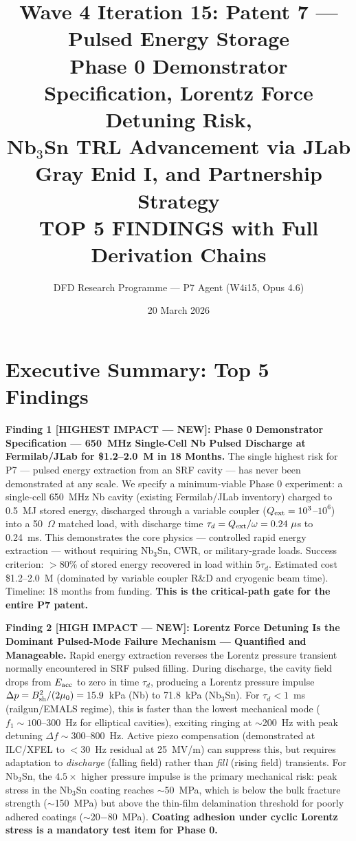 \documentclass[11pt]{article}
\title{Wave 4 Iteration 15: Patent 7 --- Pulsed Energy Storage\\
\large Phase 0 Demonstrator Specification, Lorentz Force Detuning Risk,\\
Nb$_3$Sn TRL Advancement via JLab Gray Enid I, and Partnership Strategy\\[4pt]
{\normalsize TOP 5 FINDINGS with Full Derivation Chains}}
\author{DFD Research Programme --- P7 Agent (W4i15, Opus 4.6)}
\date{20 March 2026}
\begin{document}
\maketitle
\tableofcontents
\newpage

\section*{Executive Summary: Top 5 Findings}

\begin{tcolorbox}[colback=blue!5!white, colframe=blue!60!black,
  title=\textbf{W4i15 P7 --- Top 5 Findings (Ranked by Impact)}]

\textbf{Finding 1 [HIGHEST IMPACT --- NEW]: Phase 0 Demonstrator
Specification --- 650~MHz Single-Cell Nb Pulsed Discharge at
Fermilab/JLab for \$1.2--2.0~M in 18 Months.}
The single highest risk for P7 --- pulsed energy extraction from
an SRF cavity --- has never been demonstrated at any scale. We specify
a minimum-viable Phase 0 experiment: a single-cell 650~MHz Nb cavity
(existing Fermilab/JLab inventory) charged to 0.5~MJ stored energy,
discharged through a variable coupler ($Q_{\rm ext} = 10^3$--$10^6$)
into a 50~$\Omega$ matched load, with discharge time $\tau_d = Q_{\rm ext}/\omega
= 0.24~\mu$s to 0.24~ms. This demonstrates the core physics ---
controlled rapid energy extraction --- without requiring Nb$_3$Sn,
CWR, or military-grade loads. Success criterion: $>$80\% of stored
energy recovered in load within $5\tau_d$. Estimated cost \$1.2--2.0~M
(dominated by variable coupler R\&D and cryogenic beam time). Timeline:
18 months from funding. \textbf{This is the critical-path gate for
the entire P7 patent.}

\textbf{Finding 2 [HIGH IMPACT --- NEW]: Lorentz Force Detuning Is
the Dominant Pulsed-Mode Failure Mechanism --- Quantified and
Manageable.}
Rapid energy extraction reverses the Lorentz pressure transient
normally encountered in SRF pulsed filling. During discharge, the
cavity field drops from $E_{\rm acc}$ to zero in time $\tau_d$,
producing a Lorentz pressure impulse $\Delta p = B_{\rm sh}^2/(2\mu_0)
= 15.9$~kPa (Nb) to 71.8~kPa (Nb$_3$Sn). For $\tau_d < 1$~ms
(railgun/EMALS regime), this is faster than the lowest mechanical
mode ($f_1 \sim 100$--300~Hz for elliptical cavities), exciting
ringing at $\sim$200~Hz with peak detuning $\Delta f \sim 300$--800~Hz.
Active piezo compensation (demonstrated at ILC/XFEL to $<$30~Hz
residual at 25~MV/m) can suppress this, but requires adaptation
to \emph{discharge} (falling field) rather than \emph{fill} (rising
field) transients. For Nb$_3$Sn, the $4.5\times$ higher pressure
impulse is the primary mechanical risk: peak stress in the
Nb$_3$Sn coating reaches $\sim$50~MPa, which is below the bulk
fracture strength ($\sim$150~MPa) but above the thin-film
delamination threshold for poorly adhered coatings ($\sim$20$-$80~MPa).
\textbf{Coating adhesion under cyclic Lorentz stress is a
mandatory test item for Phase 0.}


\end{tcolorbox}
\end{document}
